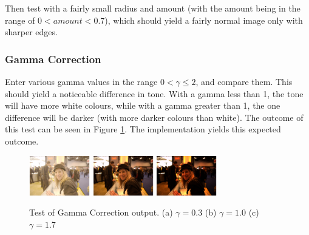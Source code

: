 \documentclass[10pt,a4paper]{article}
\begin{document}
Then test with a fairly small radius and amount (with the amount being in the range of $0 < amount < 0.7$), which should yield a fairly normal image only with sharper
edges.

\subsubsection{Gamma Correction}
Enter various gamma values in the range $0 < \gamma \leq 2$, and compare them. This should yield a noticeable difference in tone. With a gamma less than 1,
the tone will have more white colours, while with a gamma greater than 1, the one difference will be darker (with more darker colours than white). The
outcome of this test can be seen in Figure \ref{gammatest}. The implementation yields this expected outcome.

\begin{figure}\label{gammatest}
   \centering
   \subfigure
   {
       \includegraphics[width=100px]{gammacorrectionlow}
   }
   \subfigure
   {
       \includegraphics[width=100px]{gammacorrection_normal}
   }
   \subfigure
   {
       \includegraphics[width=100px]{gammacorrectionhigh}
   }
   \caption{
       Test of Gamma Correction output. 
       (a) $\gamma = 0.3$
       (b) $\gamma = 1.0$
       (c) $\gamma = 1.7$
   }
\end{figure}
\end{document}
